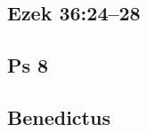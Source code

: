 \subsection{Ezek 36:24--28}

{%
\parindent 0pt
\noindent
\ifx\preLilyPondExample \undefined
\else
  \expandafter\preLilyPondExample
\fi
\def\lilypondbook{}%

\ifx\postLilyPondExample \undefined
\else
  \expandafter\postLilyPondExample
\fi
}

\subsection{Ps 8}

{%
\parindent 0pt
\noindent
\ifx\preLilyPondExample \undefined
\else
  \expandafter\preLilyPondExample
\fi
\def\lilypondbook{}%

\ifx\postLilyPondExample \undefined
\else
  \expandafter\postLilyPondExample
\fi
}

\subsection{Benedictus}

{%
\parindent 0pt
\noindent
\ifx\preLilyPondExample \undefined
\else
  \expandafter\preLilyPondExample
\fi
\def\lilypondbook{}%

\ifx\postLilyPondExample \undefined
\else
  \expandafter\postLilyPondExample
\fi
}


